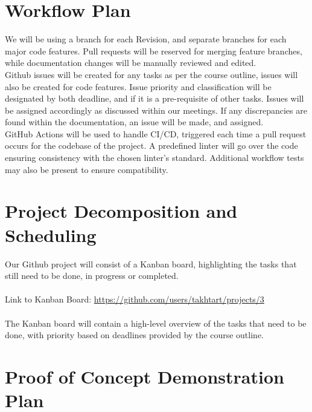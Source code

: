 \documentclass{article}
\begin{document}
\section{Workflow Plan}

We will be using a branch for each Revision, and separate branches for each
major code features. Pull requests will be reserved for merging feature branches,
while documentation changes will be manually reviewed and edited.\\

Github issues will be created for any tasks as per the course outline, issues will also be created for code features.
Issue priority and classification will be designated by both deadline, and if it is a pre-requisite of other tasks.
Issues will be assigned accordingly as discussed within our meetings. 
If any discrepancies are found within the documentation, an issue will be made, and assigned.\\

GitHub Actions will be used to handle CI/CD, triggered each time a pull request occurs for the codebase of the project. 
A predefined linter will go over the code ensuring consistency with the chosen linter's standard. 
Additional workflow tests may also be present to ensure compatibility.


\section{Project Decomposition and Scheduling}

Our Github project will consist of a Kanban board, highlighting the tasks that still need to be done, in progress or completed.\\
\\
\noindent Link to Kanban Board:
\noindent\href{https://github.com/users/takhtart/projects/3}{https://github.com/users/takhtart/projects/3}\\
\\
The Kanban board will contain a high-level overview of the tasks that need to be done, 
with priority based on deadlines provided by the course outline.

\section{Proof of Concept Demonstration Plan}
\end{document}
